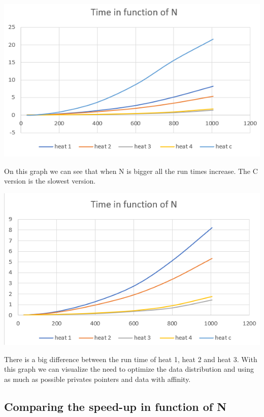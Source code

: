 \documentclass{report}
\begin{document}
\begin{center}
    \includegraphics[scale=1]{Images/time_function_of_N.png}
    \label{fig7}
\end{center}

On this graph we can see that when N is bigger all the run times increase. The C version is the slowest version.

\begin{center}
    \includegraphics[scale=1]{Images/time_function_N_no_C.png}
    \label{fig8}
\end{center}

There is a big difference between the run time of heat 1, heat 2 and heat 3. With this graph we can visualize the need to optimize the data distribution and using as much as possible privates pointers and data with affinity.

\subsection{Comparing the speed-up in function of N}
\end{document}
